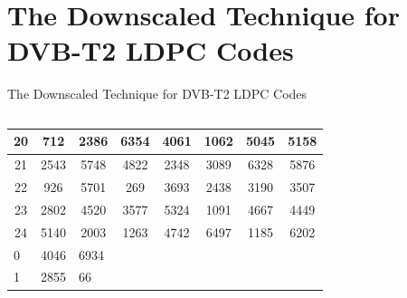 \documentclass[11pt, aspectratio=169]{beamer}
\begin{document}
\section{The Downscaled Technique for DVB-T2 LDPC Codes}
\begin{frame}{The Downscaled Technique for DVB-T2 LDPC Codes}
\vspace{-0.35cm}
\begin{columns}
\begin{table}[tb]
\begin{adjustbox}{width=0.8\textwidth , totalheight=\baselineskip,keepaspectratio}
	\begin{tabular}{|l|l|l|lllll}
		\hline
		\multicolumn{1}{|c|}{20} & \multicolumn{1}{c|}{712}  & \multicolumn{1}{c|}{2386} & \multicolumn{1}{c|}{6354} & \multicolumn{1}{c|}{4061} & \multicolumn{1}{c|}{1062} & \multicolumn{1}{c|}{5045} & \multicolumn{1}{c|}{5158} \\ \hline
		\multicolumn{1}{|c|}{21} & \multicolumn{1}{c|}{2543} & \multicolumn{1}{c|}{5748} & \multicolumn{1}{c|}{4822} & \multicolumn{1}{c|}{2348} & \multicolumn{1}{c|}{3089} & \multicolumn{1}{c|}{6328} & \multicolumn{1}{c|}{5876} \\ \hline
		\multicolumn{1}{|c|}{22} & \multicolumn{1}{c|}{926}  & \multicolumn{1}{c|}{5701} & \multicolumn{1}{c|}{269}  & \multicolumn{1}{c|}{3693} & \multicolumn{1}{c|}{2438} & \multicolumn{1}{c|}{3190} & \multicolumn{1}{c|}{3507} \\ \hline
		\multicolumn{1}{|c|}{23} & \multicolumn{1}{c|}{2802} & \multicolumn{1}{c|}{4520} & \multicolumn{1}{c|}{3577} & \multicolumn{1}{c|}{5324} & \multicolumn{1}{c|}{1091} & \multicolumn{1}{c|}{4667} & \multicolumn{1}{c|}{4449} \\ \hline
		\multicolumn{1}{|c|}{24} & \multicolumn{1}{c|}{5140} & \multicolumn{1}{c|}{2003} & \multicolumn{1}{c|}{1263} & \multicolumn{1}{c|}{4742} & \multicolumn{1}{c|}{6497} & \multicolumn{1}{c|}{1185} & \multicolumn{1}{c|}{6202} \\ \hline
		0                        & 4046                      & 6934                      &                           &                           &                           &                           &                           \\ \cline{1-3}
		1                        & 2855                      & 66                        &                           &                           &                           &                           &                           \\ \cline{1-3}

\end{tabular}
\end{adjustbox}
\end{table}
\end{columns}
\end{frame}
\end{document}
